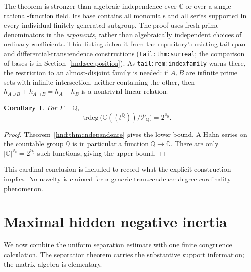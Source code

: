 \documentclass[11pt,oneside]{article}
\newtheorem{corollary}[theorem]{Corollary}
\theoremstyle{definition}
\theoremstyle{remark}
\newcommand{\C}{\mathbb C}
\newcommand{\Q}{\mathbb Q}
\newcommand{\trdeg}{\operatorname{trdeg}}
\newcommand{\lbl}[1]{\nolinkurl{#1}}%
\begin{document}
The theorem is stronger than algebraic independence over $\C$ or over a
single rational-function field. Its base contains all monomials and all
series supported in every individual finitely generated subgroup.
The proof uses fresh prime denominators in the \emph{exponents}, rather
than algebraically independent choices of ordinary coefficients.
This distinguishes it from the repository's existing tail-span and
differential-transcendence constructions \cite{repo-map}
(\lbl{tail:thm:surreal}; the comparison of bases is in
Section~\ref{hnd:sec:position}). As \lbl{tail:rem:indexfamily} warns there,
the restriction to an almost-disjoint family is needed: if $A,B$ are
infinite prime sets with infinite intersection, neither containing the
other, then $h_{A\cup B}+h_{A\cap B}=h_A+h_B$ is a nontrivial linear
relation.

\begin{corollary}\label{hnd:cor:trdeg}
For $\Gamma=\Q$,
\[
 \trdeg\bigl(\C((t^\Q))/\mathscr P_\Q\bigr)=2^{\aleph_0}.
\]
\end{corollary}
\begin{proof}
Theorem~\ref{hnd:thm:independence} gives the lower bound. A Hahn series on
the countable group $\Q$ is in particular a function $\Q\to\C$.
There are only $|\C|^{\aleph_0}=2^{\aleph_0}$ such functions, giving
the upper bound.
\end{proof}

This cardinal conclusion is included to record what the explicit
construction implies. No novelty is claimed for a generic
transcendence-degree cardinality phenomenon.

\section{Maximal hidden negative inertia}\label{hnd:sec:inertia}

We now combine the uniform separation estimate with one finite
congruence calculation. The separation theorem carries the substantive
support information; the matrix algebra is elementary.
\end{document}
